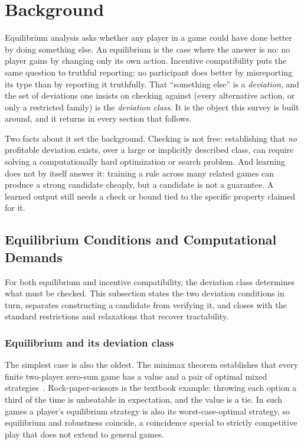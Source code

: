 
\section{Background}
\label{sec:recap}

Equilibrium analysis asks whether any player in a game could have done better by
doing something else. An equilibrium is the case where the answer is no: no player gains by changing
only its own action. Incentive compatibility puts the same question to truthful
reporting: no participant does better by misreporting its type than by reporting
it truthfully. That ``something else'' is a \emph{deviation}, and the set of deviations one insists on checking against (every alternative
action, or only a restricted family) is the \emph{deviation class}. It is the object this survey is built around, and it returns in every section that follows.

Two facts about it set the background. Checking is not free: establishing that
\emph{no} profitable deviation exists, over a large or implicitly described
class, can require solving a computationally hard optimization or search problem. And learning does not by itself answer it: training a rule across many related
games can produce a strong candidate cheaply, but a candidate is not a
guarantee. A learned output still needs a check or bound tied to the specific
property claimed for it.

\subsection{Equilibrium Conditions and Computational Demands}
\label{subsec:recap-gt}

For both equilibrium and incentive compatibility, the deviation class
determines what must be checked. This subsection states the two
deviation conditions in turn, separates constructing a candidate from verifying
it, and closes with the standard restrictions and relaxations that recover
tractability.

\subsubsection{Equilibrium and its deviation class}

The simplest case is also the oldest. The minimax theorem establishes that every
finite two-player zero-sum game has a value and a pair of optimal mixed
strategies~\citep{Neumann1928,vNM1944}. Rock-paper-scissors is the textbook example:
throwing each option a third of the time is unbeatable in expectation, and the value
is a tie. In such games a player's equilibrium strategy is also its worst-case-optimal
strategy, so equilibrium and robustness coincide, a coincidence special to strictly
competitive play that does not extend to general games.

